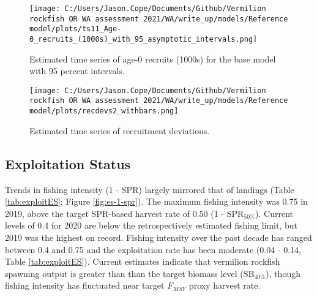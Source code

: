 \documentclass[11pt,
  english,
  a4paper,
]{article}
\begin{document}

\begin{figure}
\centering
\texttt{[image: C:/Users/Jason.Cope/Documents/Github/Vermilion rockfish OR WA assessment 2021/WA/write\_up/models/Reference model/plots/ts11\_Age-0\_recruits\_(1000s)\_with\_95\_asymptotic\_intervals.png]}
\caption{Estimated time series of age-0 recruits (1000s) for the base model with 95 percent intervals.\label{fig:es-recruits}}
\end{figure}

\tagmcend\tagstructend


\begin{figure}
\centering
\texttt{[image: C:/Users/Jason.Cope/Documents/Github/Vermilion rockfish OR WA assessment 2021/WA/write\_up/models/Reference model/plots/recdevs2\_withbars.png]}
\caption{Estimated time series of recruitment deviations.\label{fig:es-rec-devs}}
\end{figure}

\tagmcend\tagstructend

\clearpage


\hypertarget{exploitation-status}{%
\subsection*{Exploitation Status}\label{exploitation-status}}

\leavevmode\tagmcend\tagstructend


Trends in fishing intensity (1 - SPR) largely mirrored that of landings (Table \ref{tab:exploitES}; Figure \ref{fig:es-1-spr}). The maximum fishing intensity was 0.75 in 2019, above the target SPR-based harvest rate of 0.50 (1 - {\(\text{SPR}_{50\%}\)\leavevmode\tagmcend\tagstructend}). Current levels of 0.4 for 2020 are below the retrospectively estimated fishing limit, but 2019 was the highest on record. Fishing intensity over the past decade has ranged between 0.4 and 0.75 and the exploitation rate has been moderate (0.04 - 0.14, Table \ref{tab:exploitES}). Current estimates indicate that vermilion rockfish spawning output is greater than than the target biomass level ({\(\text{SB}_{40\%}\)\leavevmode\tagmcend\tagstructend}), though fishing intensity has fluctuated near target {\(F_{MSY}\)\leavevmode\tagmcend\tagstructend} proxy harvest rate.
\end{document}
